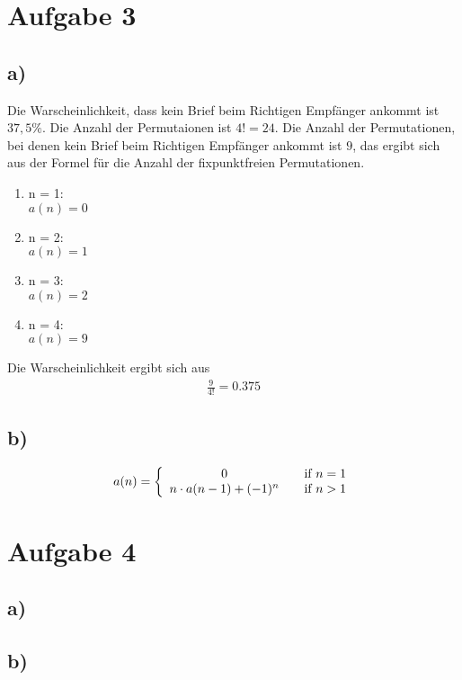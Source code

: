 \documentclass[a4paper]{scrartcl}
\begin{document}
\section*{Aufgabe 3}
\subsection*{a)}
Die Warscheinlichkeit, dass kein Brief beim Richtigen Empfänger ankommt ist $37,5\%$.
Die Anzahl der Permutaionen ist $4! = 24$.
Die Anzahl der Permutationen, bei denen kein Brief beim Richtigen Empfänger ankommt ist $9$, das ergibt sich aus der Formel 
für die Anzahl der fixpunktfreien Permutationen. 
\begin{enumerate}
    \item n = 1: \\ 
    $ a(n) = 0 $
    \item n = 2: \\
    $ a(n) = 1 $
    \item n = 3: \\
    $ a(n) = 2 $
    \item n = 4: \\
    $ a(n) = 9 $
\end{enumerate}
Die Warscheinlichkeit ergibt sich aus
\begin{align*}
    \frac{9}{4!} = 0.375
\end{align*}

\subsection*{b)}
\begin{align*}
    a(n) = \left\{ 
        \begin{array}{ c l }
            0 & \quad \textrm{if } n = 1 \\
            n \cdot a(n-1) + (-1)^n & \quad \textrm{if } n > 1 \\
        \end{array}
    \right.
\end{align*}

\section*{Aufgabe 4}
\subsection*{a)}

\subsection*{b)}
\end{document}
